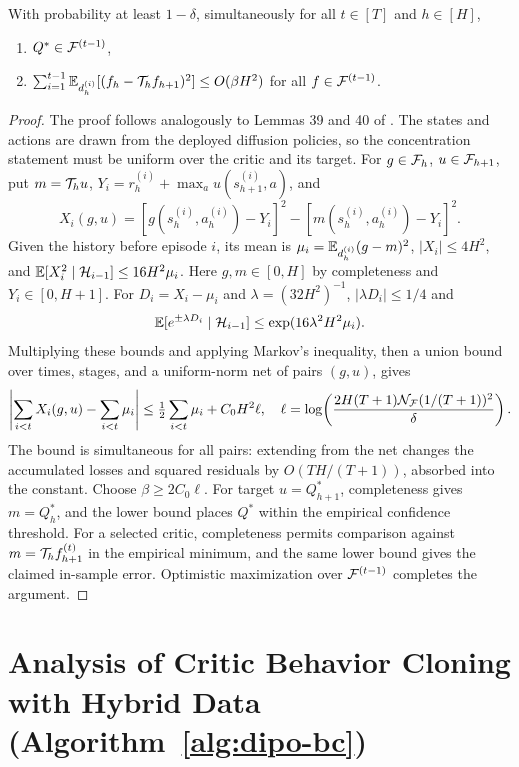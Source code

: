 \begin{lem}
    With probability at least $1-\delta$, simultaneously for all $t\in[T]$ and $h\in[H]$, 
    \begin{enumerate}[label=(\roman*)]
        \item $Q^*\in{\mathcal{F}}^{(t-1)}$,
        \item $\sum_{i=1}^{t-1}\mathbb{E}_{d_h^{(i)}}[(f_h-{\mathcal{T}}_hf_{h+1})^2] \leq O(\beta H^2)$ for all $f\in{\mathcal{F}}^{(t-1)}$.
    \end{enumerate}
    \label{lem:optimism-in-sample-error}
\end{lem}
\begin{proof}
The proof follows analogously to Lemmas 39 and 40 of \citet{jin2021bellmaneluder}. The states and actions are drawn from the deployed diffusion policies, so the concentration statement must be uniform over the critic and its target. For $g\in{\mathcal{F}}_h$, $u\in{\mathcal{F}}_{h+1}$, put $m={\mathcal{T}}_hu$, $Y_i=r_h^{(i)}+\max_a u(s_{h+1}^{(i)},a)$, and
\[
 X_i(g,u)=[g(s_h^{(i)},a_h^{(i)})-Y_i]^2-[m(s_h^{(i)},a_h^{(i)})-Y_i]^2.
\]
Given the history before episode $i$, its mean is $\mu_i=\mathbb{E}_{d_h^{(i)}}(g-m)^2$, $|X_i|\le4H^2$, and $\mathbb{E}[X_i^2\mid\mathcal H_{i-1}]\le16H^2\mu_i$. Here $g,m\in[0,H]$ by completeness and $Y_i\in[0,H+1]$. For $D_i=X_i-\mu_i$ and $\lambda=(32H^2)^{-1}$, $|\lambda D_i|\le1/4$ and
\[
 \mathbb{E}[e^{\pm\lambda D_i}\mid\mathcal H_{i-1}]\le\exp(16\lambda^2H^2\mu_i).
\]
Multiplying these bounds and applying Markov's inequality, then a union bound over times, stages, and a uniform-norm net of pairs $(g,u)$, gives
\[
 \left|\sum_{i<t}X_i(g,u)-\sum_{i<t}\mu_i\right|
 \le\tfrac12\sum_{i<t}\mu_i+C_0H^2\ell,
 \quad\ell=\log\!\left(\frac{2H(T+1){\mathcal{N}}_{\mathcal{F}}(1/(T+1))^2}{\delta}\right).
\]
The bound is simultaneous for all pairs: extending from the net changes the accumulated losses and squared residuals by $O(TH/(T+1))$, absorbed into the constant. Choose $\beta\ge2C_0\ell$. For target $u=Q_{h+1}^*$, completeness gives $m=Q_h^*$, and the lower bound places $Q^*$ within the empirical confidence threshold. For a selected critic, completeness permits comparison against $m={\mathcal{T}}_hf_{h+1}^{(t)}$ in the empirical minimum, and the same lower bound gives the claimed in-sample error. Optimistic maximization over ${\mathcal{F}}^{(t-1)}$ completes the argument.
\end{proof}

\section{Analysis of Critic Behavior Cloning with Hybrid Data (Algorithm~\ref{alg:dipo-bc})}
\label{app:dipo-fqi}




